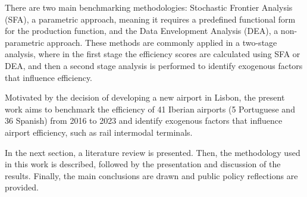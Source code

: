  There are two main benchmarking methodologies: Stochastic Frontier Analysis (SFA), a parametric approach, meaning it requires a predefined functional form
for the production function, and the Data Envelopment Analysis (DEA), a non-parametric approach. These methods are commonly applied in a two-stage analysis, where in the first stage the efficiency scores are calculated using SFA or DEA, and then a second stage analysis is performed to identify exogenous factors that influence efficiency.

Motivated by the decision of developing a new airport in Lisbon, the present work aims to benchmark the efficiency of 41 Iberian airports (5 Portuguese and 36 Spanish) from 2016 to
2023 and identify exogenous factors that influence airport efficiency, such as rail intermodal terminals.

In the next section, a literature review is presented. Then, the methodology used in this work is described, followed by the presentation and discussion of the results. Finally, the main conclusions are drawn and public policy reflections are provided.